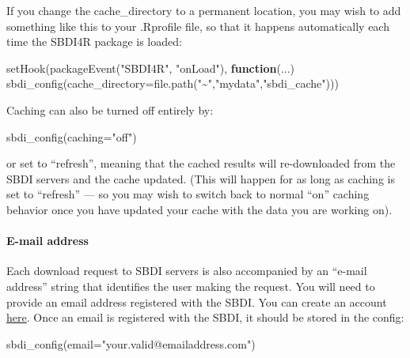 \documentclass[
  10pt,
]{article}
\newenvironment{Shaded}{\begin{snugshade}}{\end{snugshade}}
\newcommand{\AttributeTok}[1]{\textcolor[rgb]{0.77,0.63,0.00}{#1}}
\newcommand{\ControlFlowTok}[1]{\textcolor[rgb]{0.13,0.29,0.53}{\textbf{#1}}}
\newcommand{\FunctionTok}[1]{\textcolor[rgb]{0.00,0.00,0.00}{#1}}
\newcommand{\NormalTok}[1]{#1}
\newcommand{\StringTok}[1]{\textcolor[rgb]{0.31,0.60,0.02}{#1}}
\begin{document}
If you change the cache\_directory to a permanent location, you may wish to add something like this to your .Rprofile file, so that it happens automatically each time the SBDI4R package is loaded:

\begin{Shaded}
\begin{Highlighting}[]
\FunctionTok{setHook}\NormalTok{(}\FunctionTok{packageEvent}\NormalTok{(}\StringTok{"SBDI4R"}\NormalTok{, }\StringTok{"onLoad"}\NormalTok{), }
        \ControlFlowTok{function}\NormalTok{(...) }\FunctionTok{sbdi\_config}\NormalTok{(}\AttributeTok{cache\_directory=}\FunctionTok{file.path}\NormalTok{(}\StringTok{"\textasciitilde{}"}\NormalTok{,}\StringTok{"mydata"}\NormalTok{,}\StringTok{"sbdi\_cache"}\NormalTok{)))}
\end{Highlighting}
\end{Shaded}

Caching can also be turned off entirely by:

\begin{Shaded}
\begin{Highlighting}[]
\FunctionTok{sbdi\_config}\NormalTok{(}\AttributeTok{caching=}\StringTok{"off"}\NormalTok{)}
\end{Highlighting}
\end{Shaded}

or set to ``refresh'', meaning that the cached results will re-downloaded from the SBDI servers and the cache updated. (This will happen for as long as caching is set to ``refresh'' --- so you may wish to switch back to normal ``on'' caching behavior once you have updated your cache with the data you are working on).

\hypertarget{e-mail-address}{%
\paragraph*{E-mail address}\label{e-mail-address}}

Each download request to SBDI servers is also accompanied by an ``e-mail address'' string that identifies the user making the request. You will need to provide an email address registered with the SBDI. You can create an account \href{https://auth.biodiversitydata.se/cas/login}{here}. Once an email is registered with the SBDI, it should be stored in the config:

\begin{Shaded}
\begin{Highlighting}[]
\FunctionTok{sbdi\_config}\NormalTok{(}\AttributeTok{email=}\StringTok{"your.valid@emailaddress.com"}\NormalTok{)}
\end{Highlighting}
\end{Shaded}
\end{document}
